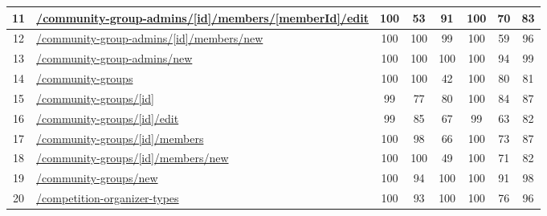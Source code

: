\begin{longtable}{|c|p{5cm}|c|c|c|c|c|c|}
      \hline
      11                                       & \url{/community-group-admins/[id]/members/[memberId]/edit} & 100              & 53               & 91               & 100              & 70               & 83            \\
      \hline
      12                                       & \url{/community-group-admins/[id]/members/new}             & 100              & 100              & 99               & 100              & 59               & 96            \\
      \hline
      13                                       & \url{/community-group-admins/new}                          & 100              & 100              & 100              & 100              & 94               & 99            \\
      \hline
      14                                       & \url{/community-groups}                                    & 100              & 100              & 42               & 100              & 80               & 81            \\
      \hline
      15                                       & \url{/community-groups/[id]}                               & 99               & 77               & 80               & 100              & 84               & 87            \\
      \hline
      16                                       & \url{/community-groups/[id]/edit}                          & 99               & 85               & 67               & 99               & 63               & 82            \\
      \hline
      17                                       & \url{/community-groups/[id]/members}                       & 100              & 98               & 66               & 100              & 73               & 87            \\
      \hline
      18                                       & \url{/community-groups/[id]/members/new}                   & 100              & 100              & 49               & 100              & 71               & 82            \\
      \hline
      19                                       & \url{/community-groups/new}                                & 100              & 94               & 100              & 100              & 91               & 98            \\
      \hline
      20                                       & \url{/competition-organizer-types}                         & 100              & 93               & 100              & 100              & 76               & 96            \\

\end{longtable}
